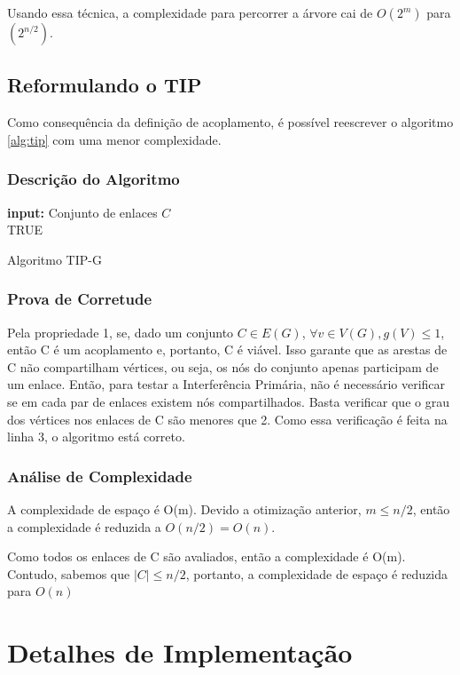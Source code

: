 Usando essa técnica, a complexidade para percorrer a árvore cai de $O(2^m)$ para $(2^{n/2})$.

\subsection{Reformulando o TIP}

Como consequência da definição de acoplamento, é possível reescrever o algoritmo \ref{alg:tip} com uma menor complexidade.

\subsubsection{Descrição do Algoritmo}

\begin{algorithm}[h]
	\SetVline
	{\bf input:} Conjunto de enlaces $C$\\
	\Return TRUE
\caption{Algoritmo TIP-G}
\label{alg:tipg}
\end{algorithm}

\subsubsection{Prova de Corretude}

Pela propriedade 1, se, dado um conjunto $C \in E(G)$, $\forall v \in V(G), g(V) \leq 1$, então C é um acoplamento e, portanto, C é viável. Isso garante que as arestas de C não compartilham vértices, ou seja, os nós do conjunto apenas participam de um enlace. Então, para testar a Interferência Primária, não é necessário verificar se em cada par de enlaces existem nós compartilhados. Basta verificar que o grau dos vértices nos enlaces de C são menores que 2. Como essa verificação é feita na linha 3, o algoritmo está correto.

\subsubsection{Análise de Complexidade}

A complexidade de espaço é O(m). Devido a otimização anterior, $m \leq n/2$, então a complexidade é reduzida a $O(n/2)=O(n)$. 

Como todos os enlaces de C são avaliados, então a complexidade é O(m). Contudo, sabemos que $|C| \leq n/2$, portanto, a complexidade de espaço é reduzida para $O(n)$

\section{Detalhes de Implementação}

